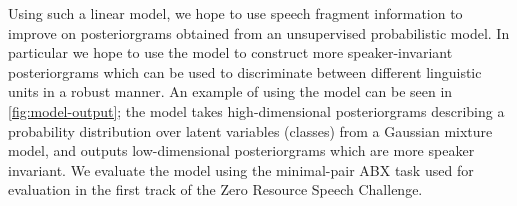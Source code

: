 Using such a linear model, we hope to use speech fragment information to improve on posteriorgrams obtained from an unsupervised probabilistic model.
In particular we hope to use the model to construct more speaker-invariant posteriorgrams which can be used to discriminate between different linguistic units in a robust manner.
An example of using the model can be seen in \cref{fig:model-output}; the model takes high-dimensional posteriorgrams describing a probability distribution over latent variables (classes) from a Gaussian mixture model, and outputs low-dimensional posteriorgrams which are more speaker invariant.
We evaluate the model using the minimal-pair ABX task used for evaluation in the first track of the Zero Resource Speech Challenge.
